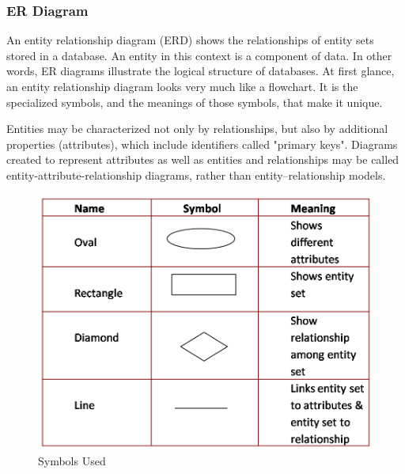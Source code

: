 \subsubsection{ER Diagram}
         An entity relationship diagram (ERD) shows the relationships of entity sets stored in a database. An entity in this context is a component of data. In other words, ER diagrams illustrate the logical structure of databases. At first glance, an entity relationship diagram looks very much like a flowchart. It is the specialized symbols, and the meanings of those symbols, that make it unique. 

Entities may be characterized not only by relationships, but also by additional properties (attributes), which include identifiers called "primary keys". Diagrams created to represent attributes as well as entities and relationships may be called entity-attribute-relationship diagrams, rather than entity–relationship models.

\begin{figure}[!h]
	\begin{center}
		\includegraphics[width=12cm]{ER_Symbol}
	\end{center}
\caption{Symbols Used}
\end{figure}



